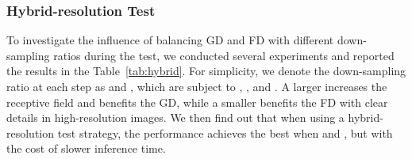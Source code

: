 \documentclass[twocolumn]{svjour3}
\begin{document}
\begin{table}[htbp]
\caption{Grid search results of the down-sampling ratio during test in GFM on AM-2k.}
\begin{center}
\end{center}
\label{tab:hybrid}
\end{table}


\subsubsection{Hybrid-resolution Test}

To investigate the influence of balancing GD and FD with different down-sampling ratios during the test, we conducted several experiments and reported the results in the Table~\ref{tab:hybrid}. For simplicity, we denote the down-sampling ratio at each step as  and , which are subject to , , and . A larger  increases the receptive field and benefits the GD, while a smaller  benefits the FD with clear details in high-resolution images. We then find out that when using a hybrid-resolution test strategy, the performance achieves the best when  and , but with the cost of slower inference time. 
\end{document}
